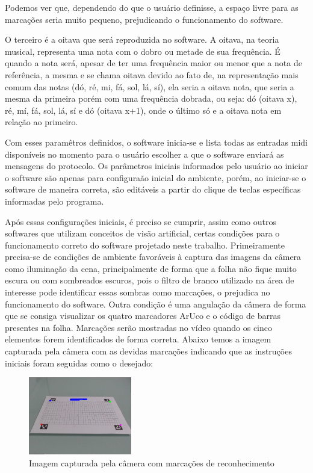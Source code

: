 \documentclass[12pt]{report}
\begin{document}
Podemos ver que, dependendo do que o usuário definisse, a espaço livre para as marcações seria muito pequeno, prejudicando o funcionamento do software.

O terceiro é a oitava que será reproduzida no software. A oitava, na teoria musical, representa uma nota com o dobro ou metade de sua frequência. É quando a nota será, apesar de ter uma frequência maior ou menor que a nota de referência, a mesma e se chama oitava devido ao fato de, na representação mais comum das notas (dó, ré, mi, fá, sol, lá, sí), ela seria a oitava nota, que seria a mesma da primeira porém com uma frequência dobrada, ou seja: dó (oitava x), ré, mí, fá, sol, lá, sí e dó (oitava x+1), onde o último só e a oitava nota em relação ao primeiro.

Com esses paramêtros definidos, o software inicia-se e lista todas as entradas midi disponíveis no momento para o usuário escolher a que o software enviará as mensagens do protocolo. Os parâmetros iniciais informados pelo usuário ao iniciar o software são apenas para configuraão inicial do ambiente, porém, ao iniciar-se o software de maneira correta, são editáveis a partir do clique de teclas específicas informadas pelo programa.

Após essas configurações iniciais, é preciso se cumprir, assim como outros softwares que utilizam conceitos de visão artificial, certas condições para o funcionamento correto do software projetado neste trabalho.
Primeiramente precisa-se de condições de ambiente favoráveis à captura das imagens da câmera como iluminação da cena, principalmente de forma que a folha não fique muito escura ou com sombreados escuros, pois o filtro de branco utilizado na área de interesse pode identificar essas sombras como marcações, o prejudica no funcionamento do software. Outra condição é uma angulação da câmera de forma que se consiga visualizar os quatro marcadores ArUco e o código de barras presentes na folha. Marcações serão mostradas no vídeo quando os cinco elementos forem identificados de forma correta. Abaixo temos a imagem capturada pela câmera com as devidas marcações indicando que as instruções iniciais foram seguidas como o desejado:

\begin{figure}[H]
  \centering
    \includegraphics[width=0.4\textwidth]{imagens/video_com_marcacoes.png}
    \caption{Imagem capturada pela câmera com marcações de reconhecimento}
    \label{fig:tudo_ok}
\end{figure}
\end{document}

